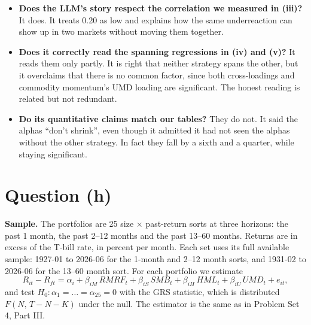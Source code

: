\documentclass[11pt]{article}
\begin{document}
\begin{itemize}
\setlength{\itemsep}{4pt}\setlength{\parskip}{0pt}

\item[(i)] \textbf{Does the LLM's story respect the correlation we measured in (iii)?} It does. It treats 0.20 as low and explains how the same underreaction can show up in two markets without moving them together.

\item[(ii)] \textbf{Does it correctly read the spanning regressions in (iv) and (v)?} It reads them only partly. It is right that neither strategy spans the other, but it overclaims that there is no common factor, since both cross-loadings and commodity momentum's UMD loading are significant. The honest reading is related but not redundant.

\item[(iii)] \textbf{Do its quantitative claims match our tables?} They do not. It said the alphas ``don't shrink'', even though it admitted it had not seen the alphas without the other strategy. In fact they fall by a sixth and a quarter, while staying significant.

\end{itemize}

\section*{Question (h)}

\textbf{Sample.} The portfolios are 25 size $\times$ past-return sorts at three horizons: the past 1 month, the past 2--12 months and the past 13--60 months. Returns are in excess of the T-bill rate, in percent per month. Each set uses its full available sample: 1927-01 to 2026-06 for the 1-month and 2--12 month sorts, and 1931-02 to 2026-06 for the 13--60 month sort. For each portfolio we estimate
\[
R_{it}-R_{ft}=\alpha_i+\beta_{iM}\,RMRF_t+\beta_{iS}\,SMB_t+\beta_{iH}\,HML_t+\beta_{iU}\,UMD_t+e_{it},
\]
and test $H_0:\alpha_1=\dots=\alpha_{25}=0$ with the GRS statistic, which is distributed $F(N,\,T-N-K)$ under the null. The estimator is the same as in Problem Set 4, Part III.
\end{document}
